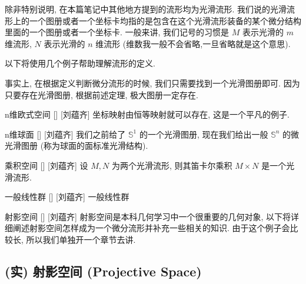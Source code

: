 \documentclass[UTF8]{ctexart}
\begin{document}
        \begin{rmk}
            [刘蕴齐]
            除非特别说明, 在本篇笔记中其他地方提到的流形均为光滑流形. 我们说的光滑流形上的一个图册或者一个坐标卡均指的是包含在这个光滑流形装备的某个微分结构里面的一个图册或者一个坐标卡. 一般来讲, 我们记号的习惯是 \(M\) 表示光滑的 \(m\) 维流形,  \(N\) 表示光滑的 \(n\) 维流形 (维数我一般不会省略,一旦省略就是这个意思). 
        \end{rmk}
        
        以下将使用几个例子帮助理解流形的定义. 
        
        \begin{rmk}
            []
            事实上, 在根据定义判断微分流形的时候, 我们只需要找到一个光滑图册即可. 因为只要存在光滑图册, 根据前述定理, 极大图册一定存在. 
        \end{rmk}
        
        \begin{xmp}
            []
            {n维欧式空间}
            []
            [刘蕴齐]
            坐标映射由恒等映射就可以存在, 这是一个平凡的例子. 
        \end{xmp}
        
        \begin{xmp}
            []
            {n维球面}
            []
            [刘蕴齐]
            我们之前给了 \(\mathbb{S}^1\) 的一个光滑图册, 现在我们给出一般 \(\mathbb{S}^n\) 的微光滑图册 (称为球面的面标准光滑结构). 
        \end{xmp}

        \begin{xmp}
            []
            {乘积空间}
            []
            [刘蕴齐]
            设 \(M,N\) 为两个光滑流形, 则其笛卡尔乘积 \( M\times N\) 是一个光滑流形. 
        \end{xmp}

        \begin{xmp}
            []
            {一般线性群}
            []
            [刘蕴齐]
            一般线性群
        \end{xmp}
        
        \begin{xmp}
            []
            {射影空间}
            []
            [刘蕴齐]
            射影空间是本科几何学习中一个很重要的几何对象, 以下将详细阐述射影空间怎样成为一个微分流形并补充一些相关的知识. 由于这个例子会比较长, 所以我们单独开一个章节去讲. 
        \end{xmp}

    \subsection{(实) 射影空间 (Projective Space)}
\end{document}
